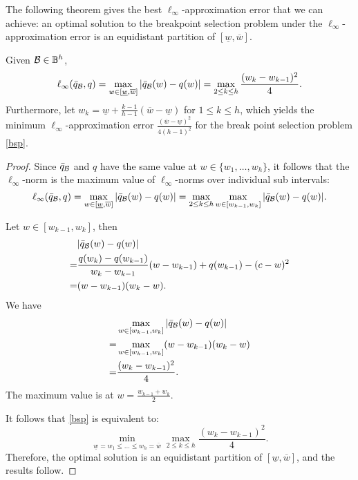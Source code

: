 The following theorem gives the best \(\ell_\infty\)-approximation error that we can achieve: an optimal solution to the breakpoint selection problem under the $\ell_\infty$-approximation error is an equidistant partition of \([\underline{w}, \overline{w}]\).

\begin{theorem}
\label{lem.approx}
Given $\mathcal B \in \mathbb B^h$,
 $$\ell_\infty(\bar{q}_{\mathcal B}, q) = \max_{w \in [\underline{w},\overline{w}] }|\bar{q}_{\mathcal B}(w) - q(w)|= \max_{2\le k \le h} \frac{(w_k - w_{k-1})^2}{4}.$$ Furthermore, let \(w_k = \underline{w} + \frac{k-1}{h-1}(  \overline{w} - \underline{w})\) for \(1 \le k \le h\), which yields the minimum \(\ell_\infty\)-approximation error \(\frac{(\overline{w} - \underline{w})^2}{4(h-1)^2}\) for the break point selection problem \eqref{bsp}.
\end{theorem}
\begin{proof}
Since $\bar{q}_{\mathcal B}$ and $q$ have the same value at $ w \in \{w_1,\hdots,w_{h}\}$, it follows that the $\ell_\infty$-norm is the maximum value of $\ell_\infty$-norms over individual sub intervals:
\begin{equation*}
\ell_\infty(\bar{q}_{\mathcal B}, q) = \max_{w \in [\underline{w},\overline{w}] }|\bar{q}_{\mathcal B}(w) - q(w)| =  \max_{2\le k \le h} \max_{w \in [w_{k-1}, w_k]} |\bar{q}_{\mathcal B}(w) - q(w)|.
\end{equation*}

Let $w \in [w_{k-1}, w_k]$, then
\begin{equation*}
\begin{split}
 & |\bar{q}_{\mathcal B}(w) - q(w)| \\
  =&\frac{q(w_k)-q(w_{k-1})}{w_{k}-w_{k-1}}(w-w_{k-1}) + q(w_{k-1}) - (c-w)^2\\
  =& (w - w_{k-1})(w_k - w).
\end{split}
\end{equation*}
We have
\begin{equation*}
\begin{split}
 &  \max_{w \in [w_{k-1}, w_k]} |\bar{q}_{\mathcal B}(w) - q(w)| \\
  =&  \max_{w \in [w_{k-1}, w_k]}  (w - w_{k-1})(w_k - w)\\
  =& \frac{(w_k -w_{k-1})^2}{4}.
\end{split}
\end{equation*}
The maximum value is at $w =  \frac{w_{k-1}+w_k}{2} $.

It follows that \eqref{bsp} is equivalent to:
\begin{equation*}
	 \min_{\underline{w} = w_1 \le \hdots \le w_h = \overline{w}} \max_{2\le k \le h}\frac{(w_k -w_{k-1})^2}{4}.
\end{equation*}
Therefore, the optimal solution is an equidistant  partition of $[\underline{w}, \overline{w}]$, and the results follow.
 \end{proof}

